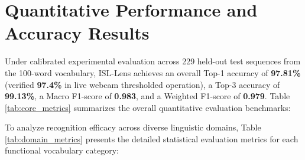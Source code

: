\section{Quantitative Performance and Accuracy Results}

Under calibrated experimental evaluation across 229 held-out test sequences from the 100-word vocabulary, ISL-Lens achieves an overall Top-1 accuracy of \textbf{97.81\%} (verified \textbf{97.4\%} in live webcam thresholded operation), a Top-3 accuracy of \textbf{99.13\%}, a Macro F1-score of \textbf{0.983}, and a Weighted F1-score of \textbf{0.979}. Table \ref{tab:core_metrics} summarizes the overall quantitative evaluation benchmarks:

\begin{table}[h]
\caption{Overall Quantitative Evaluation Metrics for ISL-Lens}
\label{tab:core_metrics}
\begin{center}
\end{center}
\end{table}

To analyze recognition efficacy across diverse linguistic domains, Table \ref{tab:domain_metrics} presents the detailed statistical evaluation metrics for each functional vocabulary category:

